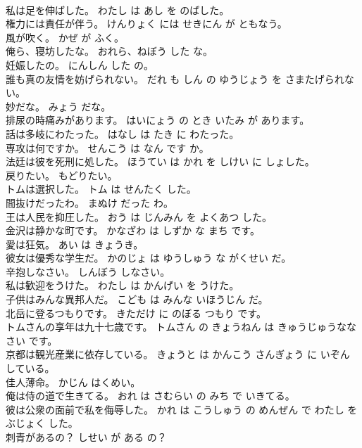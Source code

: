 \documentclass[8pt]{extreport}
\begin{document}
\begin{CJK}{UTF8}{min}
\\	私は足を伸ばした。	わたし は あし を のばした。	
\\	権力には責任が伴う。	けんりょく には せきにん が ともなう。	
\\	風が吹く。	かぜ が ふく。	
\\	俺ら、寝坊したな。	おれら、ねぼう した な。	
\\	妊娠したの。	にんしん した の。	
\\	誰も真の友情を妨げられない。	だれ も しん の ゆうじょう を さまたげられない。	
\\	妙だな。	みょう だな。	
\\	排尿の時痛みがあります。	はいにょう の とき いたみ が あります。	
\\	話は多岐にわたった。	はなし は たき に わたった。	
\\	専攻は何ですか。	せんこう は なん です か。	
\\	法廷は彼を死刑に処した。	ほうてい は かれ を しけい に しょした。	
\\	戻りたい。	もどりたい。	
\\	トムは選択した。	トム は せんたく した。	
\\	間抜けだったわ。	まぬけ だった わ。	
\\	王は人民を抑圧した。	おう は じんみん を よくあつ した。	
\\	金沢は静かな町です。	かなざわ は しずか な まち です。	
\\	愛は狂気。	あい は きょうき。	
\\	彼女は優秀な学生だ。	かのじょ は ゆうしゅう な がくせい だ。	
\\	辛抱しなさい。	しんぼう しなさい。	
\\	私は歓迎をうけた。	わたし は かんげい を うけた。	
\\	子供はみんな異邦人だ。	こども は みんな いほうじん だ。	
\\	北岳に登るつもりです。	きただけ に のぼる つもり です。	
\\	トムさんの享年は九十七歳です。	トムさん の きょうねん は きゅうじゅうななさい です。	
\\	京都は観光産業に依存している。	きょうと は かんこう さんぎょう に いぞん している。	
\\	佳人薄命。	かじん はくめい。	
\\	俺は侍の道で生きてる。	おれ は さむらい の みち で いきてる。	
\\	彼は公衆の面前で私を侮辱した。	かれ は こうしゅう の めんぜん で わたし を ぶじょく した。	
\\	刺青があるの？	しせい が ある の？	

\end{CJK}
\end{document}
